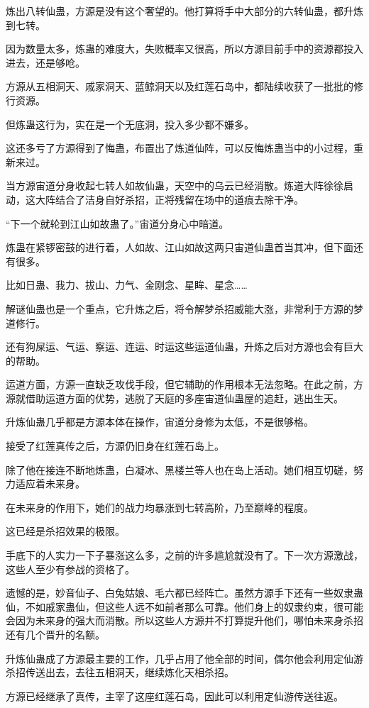 \begin{this_body}
炼出八转仙蛊，方源是没有这个奢望的。他打算将手中大部分的六转仙蛊，都升炼到七转。

因为数量太多，炼蛊的难度大，失败概率又很高，所以方源目前手中的资源都投入进去，还是够呛。

方源从五相洞天、戚家洞天、蓝鲸洞天以及红莲石岛中，都陆续收获了一批批的修行资源。

但炼蛊这行为，实在是一个无底洞，投入多少都不嫌多。

这还多亏了方源得到了悔蛊，布置出了炼道仙阵，可以反悔炼蛊当中的小过程，重新来过。

当方源宙道分身收起七转人如故仙蛊，天空中的乌云已经消散。炼道大阵徐徐启动，这大阵结合了洁身自好杀招，正将残留在场中的道痕去除干净。

“下一个就轮到江山如故蛊了。”宙道分身心中暗道。

炼蛊在紧锣密鼓的进行着，人如故、江山如故这两只宙道仙蛊首当其冲，但下面还有很多。

比如日蛊、我力、拔山、力气、金刚念、星眸、星念……

解谜仙蛊也是一个重点，它升炼之后，将令解梦杀招威能大涨，非常利于方源的梦道修行。

还有狗屎运、气运、察运、连运、时运这些运道仙蛊，升炼之后对方源也会有巨大的帮助。

运道方面，方源一直缺乏攻伐手段，但它辅助的作用根本无法忽略。在此之前，方源就借助运道方面的优势，逃脱了天庭的多座宙道仙蛊屋的追赶，逃出生天。

升炼仙蛊几乎都是方源本体在操作，宙道分身修为太低，不是很够格。

接受了红莲真传之后，方源仍旧身在红莲石岛上。

除了他在接连不断地炼蛊，白凝冰、黑楼兰等人也在岛上活动。她们相互切磋，努力适应着未来身。

在未来身的作用下，她们的战力均暴涨到七转高阶，乃至巅峰的程度。

这已经是杀招效果的极限。

手底下的人实力一下子暴涨这么多，之前的许多尴尬就没有了。下一次方源激战，这些人至少有参战的资格了。

遗憾的是，妙音仙子、白兔姑娘、毛六都已经阵亡。虽然方源手下还有一些奴隶蛊仙，不如戚家蛊仙，但这些人远不如前者那么可靠。他们身上的奴隶约束，很可能会因为未来身的强大而消散。所以这些人方源并不打算提升他们，哪怕未来身杀招还有几个晋升的名额。

升炼仙蛊成了方源最主要的工作，几乎占用了他全部的时间，偶尔他会利用定仙游杀招传送出去，去往五相洞天，继续炼化天相杀招。

方源已经继承了真传，主宰了这座红莲石岛，因此可以利用定仙游传送往返。


\end{this_body}
